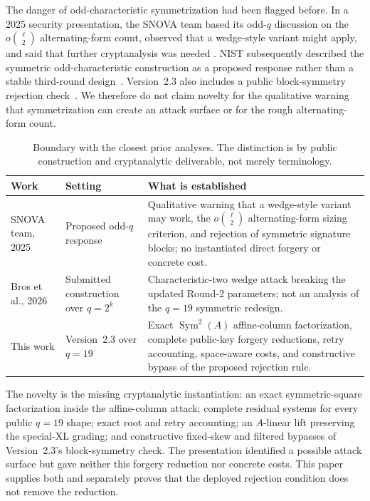 \documentclass[11pt]{article}
\newcommand{\Sym}{\operatorname{Sym}}
\newcommand{\SNOVA}{\textsf{SNOVA}}
\begin{document}
The danger of odd-characteristic symmetrization had been flagged before.  In a
2025 security presentation, the \SNOVA{} team based its odd-$q$ discussion on
the $o\binom{\ell}{2}$ alternating-form count, observed that a wedge-style
variant might apply, and said that further cryptanalysis was needed
\cite{WangEtAl2025Round2Security}.  NIST subsequently described the symmetric
odd-characteristic construction as a proposed response rather than a stable
third-round design~\cite{NISTIR8610}.  Version~2.3 also includes a public
block-symmetry rejection check~\cite{SNOVA23}.  We therefore do not claim
novelty for the qualitative warning that symmetrization can create an attack
surface or for the rough alternating-form count.


\begin{table}[H]
\centering
\caption{Boundary with the closest prior analyses.  The distinction is by
public construction and cryptanalytic deliverable, not merely terminology.}
\label{tab:prior-art-boundary}
\small
\renewcommand{\arraystretch}{1.13}
\begin{tabularx}{0.97\textwidth}{@{}>{\raggedright\arraybackslash}p{}>{\raggedright\arraybackslash}p{}X@{}}
\toprule
Work & Setting & What is established\\
\midrule
SNOVA team, 2025~\cite{WangEtAl2025Round2Security} & Proposed odd-$q$ response &
Qualitative warning that a wedge-style variant may work, the
$o\binom{\ell}{2}$ alternating-form sizing criterion, and rejection of
symmetric signature blocks; no instantiated direct forgery or concrete cost.\\
Bros et al., 2026~\cite{BrosEtAl2026SNOVAWedge} & Submitted construction over
$q=2^k$ & Characteristic-two wedge attack breaking the updated Round-2
parameters; not an analysis of the $q=19$ symmetric redesign.\\
This work & Version~2.3 over $q=19$ & Exact $\Sym^2(A)$ affine-column
factorization, complete public-key forgery reductions, retry accounting,
space-aware costs, and constructive bypass of the proposed rejection rule.\\
\bottomrule
\end{tabularx}
\end{table}

The novelty is the missing cryptanalytic instantiation: an exact
symmetric-square factorization inside the affine-column attack; complete
residual systems for every public $q=19$ shape; exact root and retry accounting;
an $A$-linear lift preserving the special-XL grading; and constructive
fixed-skew and filtered bypasses of Version~2.3's block-symmetry check.  The
presentation identified a possible attack surface but gave neither this
forgery reduction nor concrete costs.  This paper supplies both and separately
proves that the deployed rejection condition does not remove the reduction.
\end{document}
